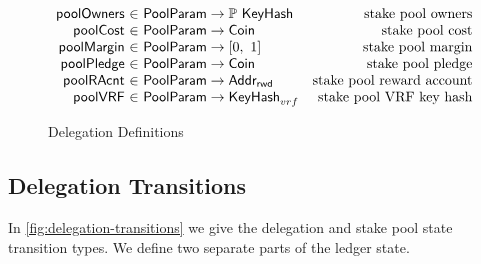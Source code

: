 \begin{figure}[htb]
\begin{equation*}
  \begin{array}{r@{~\in~}lr}
    \fun{poolOwners} & \PoolParam \to \powerset{\KeyHash}
                     & \text{stake pool owners}
    \\
    \fun{poolCost} & \PoolParam \to \Coin
                     & \text{stake pool cost}
    \\
    \fun{poolMargin} & \PoolParam \to \unitInterval
                     & \text{stake pool margin}
    \\
    \fun{poolPledge} & \PoolParam \to \Coin
                     & \text{stake pool pledge}
    \\
    \fun{poolRAcnt} & \PoolParam \to \AddrRWD
                     & \text{stake pool reward account}
    \\
    \fun{poolVRF} & \PoolParam \to \KeyHash_{vrf}
                  & \text{stake pool VRF key hash}
    \\
  \end{array}
  \end{equation*}

  \caption{Delegation Definitions}
  \label{fig:delegation-defs}
\end{figure}

\clearpage

\subsection{Delegation Transitions}
\label{sec:deleg-trans}


In \cref{fig:delegation-transitions} we give the delegation and stake pool
state transition types. We define two separate parts of the ledger state.

